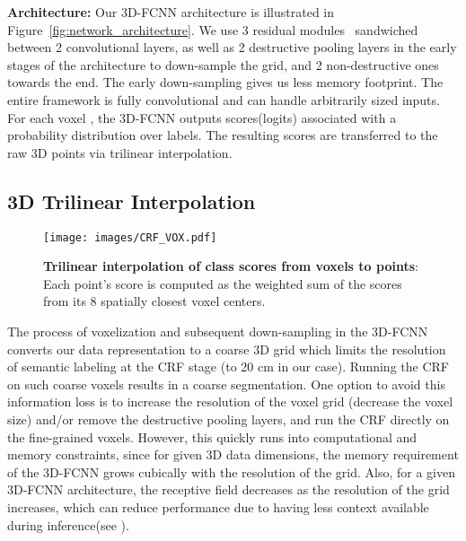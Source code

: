 \documentclass[10pt,twocolumn,letterpaper]{article}
\newcommand{\threedfcnn}[0]{3D-FCNN\xspace}
\begin{document}
\noindent\textbf{Architecture:} Our \threedfcnn architecture is illustrated in Figure~\ref{fig:network_architecture}. We use 3 residual modules~\cite{ResNet} sandwiched between 2 convolutional layers, as well as 2 destructive pooling layers in the early stages of the architecture to down-sample the grid, and 2 non-destructive ones towards the end. The early down-sampling gives us less memory footprint. The entire framework is fully convolutional and can handle arbitrarily sized inputs. For each voxel , the \threedfcnn outputs scores(logits)  associated with a probability distribution   over labels. The resulting scores are transferred to the raw 3D points via trilinear interpolation.

\subsection{3D Trilinear Interpolation} \label{sec:trilinear}

\begin{figure}
    \centering
    \texttt{[image: images/CRF\_VOX.pdf]}
    \caption{\small{\textbf{Trilinear interpolation of class scores from voxels to points}: Each point's score is computed as the weighted sum of the scores from its 8 spatially closest voxel centers.}}
    \label{fig:CRF}
\end{figure}

The process of voxelization and subsequent down-sampling in the \threedfcnn converts our data representation to a coarse 3D grid which limits the resolution of semantic labeling at the CRF stage (to 20 cm in our case). Running the CRF on such coarse voxels results in a coarse segmentation. One option to avoid this information loss is to increase the resolution of the voxel grid (\ie decrease the voxel size) and/or remove the destructive pooling layers, and run the CRF directly on the fine-grained voxels. However, this quickly runs into computational and memory constraints, since for given 3D data dimensions, the memory requirement of the \threedfcnn grows cubically with the resolution of the grid. Also, for a given \threedfcnn architecture, the receptive field decreases as the resolution of the grid increases, which can reduce performance due to having less context available during inference(see \cite{segcloudsuppl}). 
\end{document}
